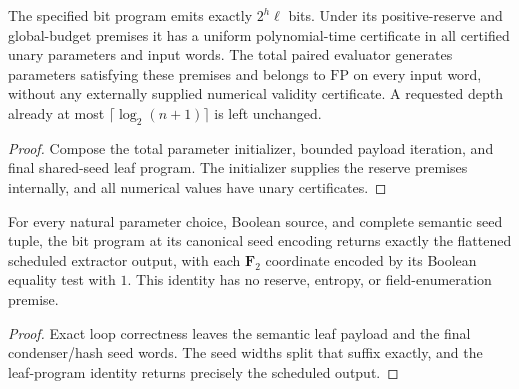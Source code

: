 \begin{theorem}
  \label{thm:lowerbounds-algebraic-scheduled-program}
  \leanok
  The specified bit program emits exactly $2^h\ell$ bits. Under its
  positive-reserve and global-budget premises it has a uniform
  polynomial-time certificate in all certified unary parameters and input
  words. The total paired evaluator generates parameters satisfying these
  premises and belongs to $\mathrm{FP}$ on every input word, without any
  externally supplied numerical validity certificate. A requested depth
  already at most $\lceil\log_2(n+1)\rceil$ is left unchanged.
\end{theorem}
\begin{proof}
  \leanok
  Compose the total parameter initializer, bounded payload iteration, and
  final shared-seed leaf program. The initializer supplies the reserve
  premises internally, and all numerical values have unary certificates.
\end{proof}

\begin{theorem}
  \label{thm:lowerbounds-algebraic-scheduled-program-correctness}
  \leanok
  For every natural parameter choice, Boolean source, and complete semantic
  seed tuple, the bit program at its canonical seed encoding returns
  exactly the flattened scheduled extractor output, with each
  $\mathbf F_2$ coordinate encoded by its Boolean equality test with $1$.
  This identity has no reserve, entropy, or field-enumeration premise.
\end{theorem}
\begin{proof}
  \leanok
  Exact loop correctness leaves the semantic leaf payload and the final
  condenser/hash seed words. The seed widths split that suffix exactly,
  and the leaf-program identity returns precisely the scheduled output.
\end{proof}

